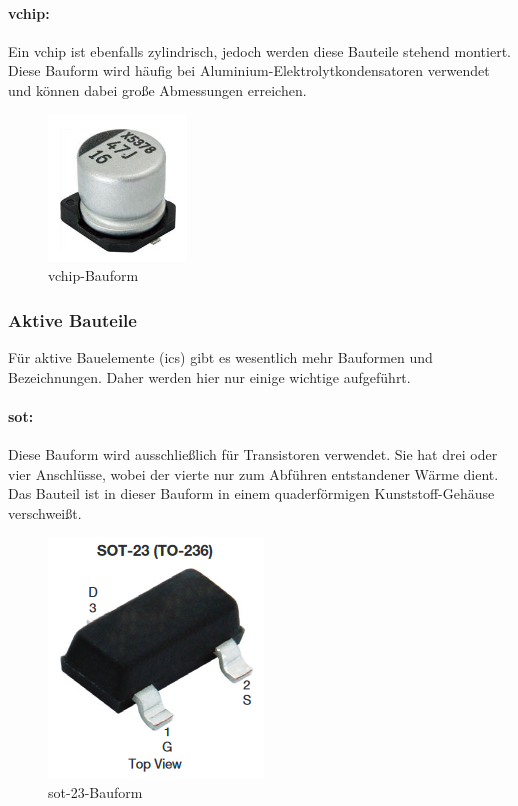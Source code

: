 \paragraph{\ac{vchip}:}
Ein \ac{vchip} ist ebenfalls zylindrisch, jedoch werden diese Bauteile stehend montiert.
Diese Bauform wird häufig bei Aluminium-Elektrolytkondensato\-ren verwendet und können dabei große Abmessungen erreichen.
\begin{figure}[htbp!]
	\centering
	\includegraphics{images/technische_grundlagen/vchip.png}
	\caption{\ac{vchip}-Bauform \cite[vgl.][]{vishay-vchip}}
\end{figure}

\subsubsection{Aktive Bauteile}
Für aktive Bauelemente (\acp{ic}) gibt es wesentlich mehr Bauformen und Bezeichnungen. Daher werden hier nur einige wichtige aufgeführt.
\paragraph{\ac{sot}:}
Diese Bauform wird ausschließlich für Transistoren verwendet. Sie hat drei oder vier Anschlüsse, wobei der vierte nur zum Abführen entstandener Wärme dient. Das Bauteil ist in dieser Bauform in einem quaderförmigen Kunststoff-Gehäuse verschweißt.
\begin{figure}[htbp!]
	\centering
	\includegraphics{images/technische_grundlagen/sot-23.png}
	\caption{\ac{sot}-23-Bauform \cite[vgl.][]{vishay-sot}}
\end{figure}

